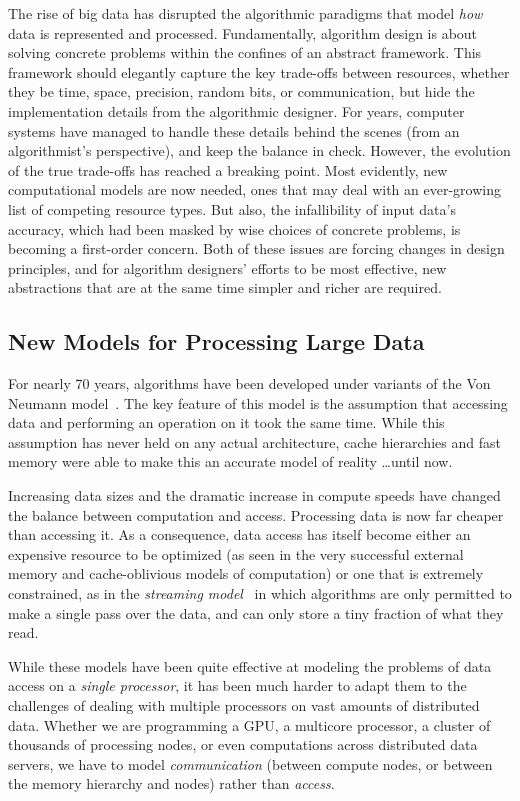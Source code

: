 \documentclass{article}
\begin{document}
The rise of big data has disrupted the algorithmic paradigms that model \emph{how} data is represented and processed.  
Fundamentally, algorithm design is about solving concrete problems within the confines of an abstract framework.  This framework should elegantly capture the key trade-offs between resources, whether they be time, space, precision, random bits, or communication, but hide the implementation details from the algorithmic designer.  For years, computer systems have managed to handle these details behind the scenes (from an algorithmist's perspective), and keep the balance in check.  
However, the evolution of the true trade-offs has reached a breaking point.  
Most evidently, new computational models are now needed, ones that may deal with an ever-growing list of competing resource types.  
But also, the infallibility of input data's accuracy, which had been masked by wise choices of concrete problems, is becoming a first-order concern.  
Both of these issues are forcing changes in design principles, and for algorithm designers' efforts to be most effective, new abstractions that are at the same time simpler and richer are required.  



\subsection*{New Models for Processing Large Data}

For nearly 70 years, algorithms have been developed under variants of the Von
Neumann model~\cite{VonNeumann}. The key feature of this model is the assumption that accessing data and performing an operation on it took the same time. While this
assumption has never  held on any actual architecture, cache hierarchies and fast memory were able to make this an accurate model of reality \ldots until now.

Increasing data sizes and the dramatic increase in compute speeds have changed the balance between computation and access. Processing data is now far cheaper than accessing it.  As a consequence, data access has itself become either an expensive resource to be optimized (as seen in the very successful external memory and cache-oblivious models of computation) or one that is extremely constrained, as in the \emph{streaming model}~\cite{streaming} in which algorithms are only permitted to make a single pass over the data, and can only store a tiny fraction of what they read. 

While these models have been quite effective at modeling the problems of data access on a \emph{single processor}, it has been much harder to adapt them to the challenges of dealing with multiple processors on vast amounts of distributed data. Whether we are programming
a GPU, a multicore processor, a cluster of thousands of processing nodes, or even computations across distributed data servers, we have to model \emph{communication} (between compute nodes, or between the memory hierarchy and nodes) rather than \emph{access}. 
\end{document}
